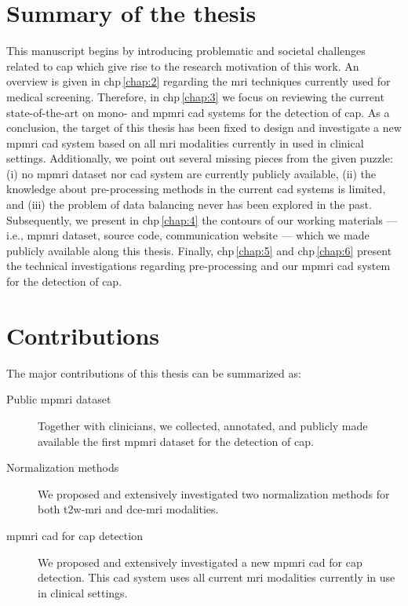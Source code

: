 \section{Summary of the thesis}

This manuscript begins by introducing problematic and societal challenges related to \ac{cap} which give rise to the research motivation of this work.
An overview is given in \acs{chp}\,\ref{chap:2} regarding the \ac{mri} techniques currently used for medical screening.
Therefore, in \acs{chp}\,\ref{chap:3} we focus on reviewing the current state-of-the-art on mono- and \ac{mpmri} \ac{cad} systems for the detection of \ac{cap}.
As a conclusion, the target of this thesis has been fixed to design and investigate a new \ac{mpmri} \ac{cad} system based on all \ac{mri} modalities currently in used in clinical settings.
Additionally, we point out several missing pieces from the given puzzle: (i) no \ac{mpmri} dataset nor \ac{cad} system are currently publicly available, (ii) the knowledge about pre-processing methods in the current \ac{cad} systems is limited, and (iii) the problem of data balancing never has been explored in the past.
Subsequently, we present in \acs{chp}\,\ref{chap:4} the contours of our working materials --- i.e., \ac{mpmri} dataset, source code, communication website --- which we made publicly available along this thesis.
Finally, \acs{chp}\,\ref{chap:5} and \acs{chp}\,\ref{chap:6} present the technical investigations regarding pre-processing and our \ac{mpmri} \ac{cad} system for the detection of \ac{cap}.

\section{Contributions}

The major contributions of this thesis can be summarized as:

\begin{description}
\item[Public \ac{mpmri} dataset] Together with clinicians, we collected, annotated, and publicly made available the first \ac{mpmri} dataset for the detection of \ac{cap}.
\item[Normalization methods] We proposed and extensively investigated two normalization methods for both \ac{t2w}-\ac{mri} and \ac{dce}-\ac{mri} modalities.
\item[\Ac{mpmri} \ac{cad} for \ac{cap} detection] We proposed and extensively investigated a new \ac{mpmri} \ac{cad} for \ac{cap} detection.
This \ac{cad} system uses all current \ac{mri} modalities currently in use in clinical settings.
\end{description}


